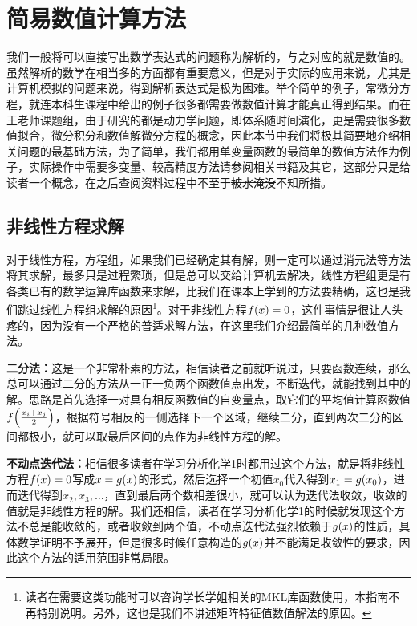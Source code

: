 \documentclass[12pt,a4paper,openany,twoside]{book}
\numberwithin{equation}{section}
\begin{document}
      \section{简易数值计算方法}
        我们一般将可以直接写出数学表达式的问题称为解析的，与之对应的就是数值的。虽然解析的数学在相当多的方面都有重要意义，但是对于实际的应用来说，尤其是计算机模拟的问题来说，得到解析表达式是极为困难。举个简单的例子，常微分方程，就连本科生课程中给出的例子很多都需要做数值计算才能真正得到结果。而在王老师课题组，由于研究的都是动力学问题，即体系随时间演化，更是需要很多数值拟合，微分积分和数值解微分方程的概念，因此本节中我们将极其简要地介绍相关问题的最基础方法，为了简单，我们都用单变量函数的最简单的数值方法作为例子，实际操作中需要多变量、较高精度方法请参阅相关书籍\cite{numerical_calc_methods}及其它，这部分只是给读者一个概念，在之后查阅资料过程中不至于\sout{被水淹没}不知所措。
        \subsection{非线性方程求解}
          对于线性方程，方程组，如果我们已经确定其有解，则一定可以通过消元法等方法将其求解，最多只是过程繁琐，但是总可以交给计算机去解决，线性方程组更是有各类已有的数学运算库函数来求解，比我们在课本上学到的方法要精确，这也是我们跳过线性方程组求解的原因\footnote{读者在需要这类功能时可以咨询学长学姐相关的MKL库函数使用，本指南不再特别说明。另外，这也是我们不讲述矩阵特征值数值解法的原因。}。对于非线性方程$f\qty(x)=0$，这件事情是很让人头疼的，因为没有一个严格的普适求解方法，在这里我们介绍最简单的几种数值方法。

          \textbf{二分法：}这是一个非常朴素的方法，相信读者之前就听说过，只要函数连续，那么总可以通过二分的方法从一正一负两个函数值点出发，不断迭代，就能找到其中的解。思路是首先选择一对具有相反函数值的自变量点，取它们的平均值计算函数值$f\qty(\frac{x_i+x_j}{2})$，根据符号相反的一侧选择下一个区域，继续二分，直到两次二分的区间都极小，就可以取最后区间的点作为非线性方程的解。

          \textbf{不动点迭代法：}相信很多读者在学习分析化学1时都用过这个方法，就是将非线性方程$f\qty(x)=0$写成$x=g\qty(x)$的形式，然后选择一个初值$x_0$代入得到$x_1=g\qty(x_0)$，进而迭代得到$x_2,x_3,\dots$，直到最后两个数相差很小，就可以认为迭代法收敛，收敛的值就是非线性方程的解。我们还相信，读者在学习分析化学1的时候就发现这个方法不总是能收敛的，或者收敛到两个值，不动点迭代法强烈依赖于$g\qty(x)$的性质，具体数学证明不予展开，但是很多时候任意构造的$g\qty(x)$并不能满足收敛性的要求，因此这个方法的适用范围非常局限。
\end{document}

